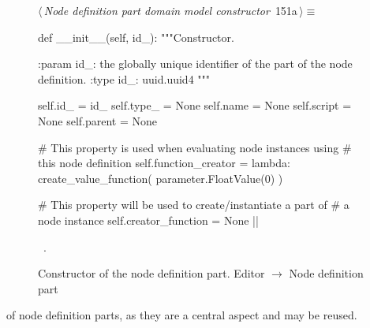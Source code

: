 \documentclass[%
    a4paper,    %
    justified,  %
    nobib,      %
    openany     %
]{tufte-book}
\makeatletter
\renewcommand{\label}[1]{\@tufte@label{##1}}%
\makeatother
\begin{document}
\begin{figure}[!htbp]
\begin{flushleft} \small
\begin{minipage}{\linewidth}\label{scrap109}\raggedright\small
{} $\langle\,${\itshape Node definition part domain model constructor}\nobreak\ {\footnotesize {151a}}$\,\rangle\equiv$
\vspace{-1ex}
\begin{pythoncode}
def __init__(self, id_):
    """Constructor.

    :param id_: the globally unique identifier of the part of
                the node definition.
    :type  id_: uuid.uuid4
    """

    self.id_    = id_
    self.type_  = None
    self.name   = None
    self.script = None
    self.parent = None

    # This property is used when evaluating node instances using
    # this node definition
    self.function_creator = lambda: create_value_function(
        parameter.FloatValue(0)
    )

    # This property will be used to create/instantiate a part of
    # a node instance
    self.creator_function = None
    |\NWsep|
\end{pythoncode}
\vspace{1.5ex}
\footnotesize
\begin{list}{}{\setlength{\itemsep}{-\parsep}\setlength{\itemindent}{-\leftmargin}}
\item \NWtxtMacroRefIn\ .

\item{}
\end{list}
\end{minipage}\vspace{4ex}
\end{flushleft}
\caption{Constructor of the node definition part.
  \newline{}\newline{}Editor $\rightarrow$ Node definition part}
\end{figure}

 of node definition parts, as
they are a central aspect and may be reused.
\end{document}
